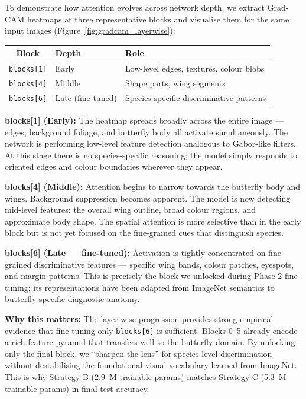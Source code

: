 \documentclass[journal, twocolumn]{IEEEtran}
\begin{document}
To demonstrate how attention evolves across network depth, we extract Grad-CAM heatmaps at three representative blocks and visualise them for the same input images (Figure~\ref{fig:gradcam_layerwise}):

\begin{table}[H]
\centering
\renewcommand{\arraystretch}{1.1}
\begin{tabular}{clp{3.8cm}}
\toprule
\textbf{Block} & \textbf{Depth} & \textbf{Role} \\
\midrule
\texttt{blocks[1]} & Early  & Low-level edges, textures, colour blobs \\
\texttt{blocks[4]} & Middle & Shape parts, wing segments \\
\texttt{blocks[6]} & Late (fine-tuned) & Species-specific discriminative patterns \\
\bottomrule
\end{tabular}
\end{table}


\textbf{blocks[1] (Early):} The heatmap spreads broadly across the entire image — edges, background foliage, and butterfly body all activate simultaneously. The network is performing low-level feature detection analogous to Gabor-like filters. At this stage there is no species-specific reasoning; the model simply responds to oriented edges and colour boundaries wherever they appear.

\textbf{blocks[4] (Middle):} Attention begins to narrow towards the butterfly body and wings. Background suppression becomes apparent. The model is now detecting mid-level features: the overall wing outline, broad colour regions, and approximate body shape. The spatial attention is more selective than in the early block but is not yet focused on the fine-grained cues that distinguish species.

\textbf{blocks[6] (Late --- fine-tuned):} Activation is tightly concentrated on fine-grained discriminative features --- specific wing bands, colour patches, eyespots, and margin patterns. This is precisely the block we unlocked during Phase 2 fine-tuning; its representations have been adapted from ImageNet semantics to butterfly-specific diagnostic anatomy.

\textbf{Why this matters:} The layer-wise progression provides strong empirical evidence that fine-tuning only \texttt{blocks[6]} is sufficient. Blocks 0--5 already encode a rich feature pyramid that transfers well to the butterfly domain. By unlocking only the final block, we ``sharpen the lens'' for species-level discrimination without destabilising the foundational visual vocabulary learned from ImageNet. This is why Strategy B (2.9~M trainable params) matches Strategy C (5.3~M trainable params) in final test accuracy.
\end{document}
